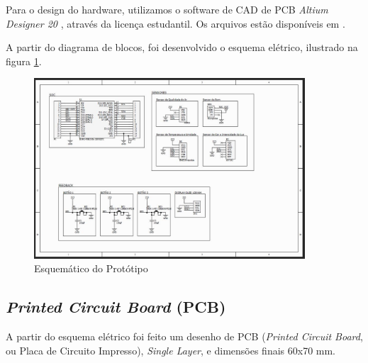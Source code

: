 \documentclass[../monografia.tex]{subfiles}
\begin{document}
Para o design do hardware, utilizamos o software de CAD de PCB \textit{Altium Designer 20} \cite{altium}, através da licença estudantil. Os arquivos estão disponíveis em \cite{git_hw}. 

A partir do diagrama de blocos, foi desenvolvido o esquema elétrico, ilustrado na figura \ref{fig:img2}.

\begin{figure}[h]
	\centering
	\includegraphics[width=0.9\textwidth]{sch}
	\caption{Esquemático do Protótipo}
	\label{fig:img2}
\end{figure}

\subsection{\textit{Printed Circuit Board} (PCB)} 

A partir do esquema elétrico foi feito um desenho de PCB (\textit{Printed Circuit Board}, ou Placa de Circuito Impresso), \textit{Single Layer}, e dimensões finais 60x70 mm. 
\end{document}
